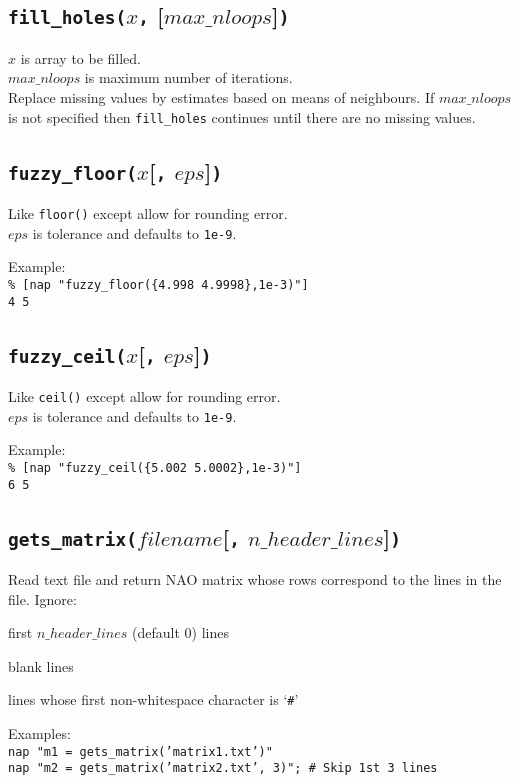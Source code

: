 \subsection{\texttt{fill\_holes(}$x$\texttt{,} [$\mathit{max\_nloops}$]\texttt{)}}
    \label{nap-function-lib-fill-holes}

    $x$ is array to be filled.
    \\
    $\mathit{max\_nloops}$ is maximum number of iterations.
    \\
    Replace missing values by estimates based on means of neighbours.
    If $max\_nloops$ is not specified then \texttt{fill\_holes}
    continues until there are no missing values.

\subsection{\texttt{fuzzy\_floor(}$x$[\texttt{,} $\mathit{eps}$]\texttt{)}}
    \label{nap-function-lib-fuzzy-floor} 

Like 
  \texttt{floor()} except allow for rounding error.
  \\
  $\mathit{eps}$ is tolerance and defaults to 
  \texttt{1e-9}.
  \par Example:
  \\
  \texttt{\% [nap "fuzzy\_floor(\{4.998 4.9998\},1e-3)"]
  \\4 5}

\subsection{\texttt{fuzzy\_ceil(}$x$[\texttt{,} $\mathit{eps}$]\texttt{)}}
    \label{nap-function-lib-fuzzy-ceil}

Like 
  \texttt{ceil()} except allow for rounding error.
  \\
  $\mathit{eps}$ is tolerance and defaults to 
  \texttt{1e-9}.
  \par Example:
  \\
  \texttt{\% [nap "fuzzy\_ceil(\{5.002 5.0002\},1e-3)"]
  \\6 5}

\subsection{\texttt{gets\_matrix(}$\mathit{filename}$[\texttt{,} $\mathit{n\_header\_lines}$]\texttt{)}}
    \label{nap-function-lib-gets-matrix}

Read text file and return NAO matrix whose rows correspond to
  the lines in the file. Ignore:
\begin{bullets}
    \item first $\mathit{n\_header\_lines}$ (default 0) lines
    \item blank lines
    \item lines whose first non-whitespace character is `\texttt{\#}'
\end{bullets}
Examples:
  \\
  \texttt{nap "m1 = gets\_matrix('matrix1.txt')"
  \\nap "m2 = gets\_matrix('matrix2.txt', 3)"; \# Skip 1st 3 lines}

